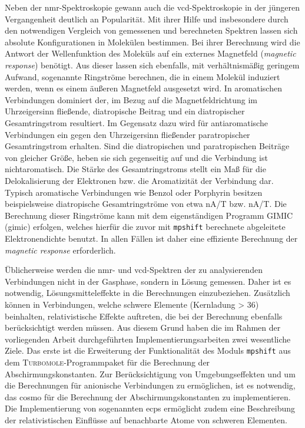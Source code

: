 Neben der \ac{nmr}-Spektroskopie gewann auch die \ac{vcd}-Spektroskopie in der jüngeren Vergangenheit deutlich an Popularität. Mit ihrer Hilfe und insbesondere durch den notwendigen Vergleich von gemessenen und berechneten Spektren lassen sich absolute Konfigurationen in Molekülen bestimmen. Bei ihrer Berechnung wird die Antwort der Wellenfunktion des Moleküls auf ein externes Magnetfeld (\textit{magnetic response}) benötigt. Aus dieser lassen sich ebenfalls, mit verhältnismäßig geringem Aufwand, sogenannte Ringströme berechnen, die in einem Molekül induziert werden, wenn es einem äußeren Magnetfeld ausgesetzt wird.\supercite{taubert2011calculation} In aromatischen Verbindungen dominiert der, im Bezug auf die Magnetfeldrichtung im Uhrzeigersinn fließende, diatropische Beitrag und ein diatropischer Gesamtringstrom resultiert. Im Gegensatz dazu wird für antiaromatische Verbindungen ein gegen den Uhrzeigersinn fließender paratropischer Gesamtringstrom erhalten. Sind die diatropischen und paratropischen Beiträge von gleicher Größe, heben sie sich gegenseitig auf und die Verbindung ist nichtaromatisch. Die Stärke des Gesamtringstroms stellt ein Maß für die Delokalisierung der Elektronen bzw. die Aromatizität der Verbindung dar.\supercite{elvidge1961181,pople1966induced} Typisch aromatische Verbindungen wie Benzol oder Porphyrin besitzen beispielsweise diatropische Gesamtringströme von etwa \unit[12]{nA/T} bzw. \unit[27]{nA/T}.\supercite{fliegl2012aromatic}
Die Berechnung dieser Ringströme kann mit dem eigenständigen Programm GIMIC (\acl{gimic})\supercite{juselius2004calculation,taubert2011calculation,fliegl2011gauge,sundholm2016calculations} erfolgen, welches hierfür die zuvor mit \texttt{mpshift} berechnete abgeleitete Elektronendichte benutzt. In allen Fällen ist daher eine effiziente Berechnung der \textit{magnetic response} erforderlich.


\bigskip
Üblicherweise werden die \ac{nmr}- und \ac{vcd}-Spektren der zu analysierenden Verbindungen nicht in der Gasphase, sondern in Lösung gemessen. Daher ist es notwendig, Lösungsmitteleffekte in die Berechnungen einzubeziehen. Zusätzlich können in Verbindungen, welche schwere Elemente (Kernladung > 36) beinhalten, relativistische Effekte auftreten, die bei der Berechnung ebenfalls berücksichtigt werden müssen. Aus diesem Grund haben die im Rahmen der vorliegenden Arbeit durchgeführten Implementierungsarbeiten zwei wesentliche Ziele. Das erste ist die Erweiterung der Funktionalität des Moduls \texttt{mpshift}\supercite{haser1992direct,kollwitz1996direct} aus dem  \textsc{Turbomole}-Programmpaket\supercite{ahlrichs1989electronic,TURBOMOLE,furche2014turbomole} für die Berechnung der Abschirmungskonstanten. Zur Berücksichtigung von Umgebungseffekten und um die Berechnungen für anionische Verbindungen zu ermöglichen, ist es notwendig, das \ac{cosmo}\supercite{klamt1993cosmo} für die Berechnung der Abschirmungskonstanten zu implementieren. Die Implementierung von sogenannten \acp{ecp} ermöglicht zudem eine Beschreibung der relativistischen Einflüsse auf benachbarte Atome von schweren Elementen.

